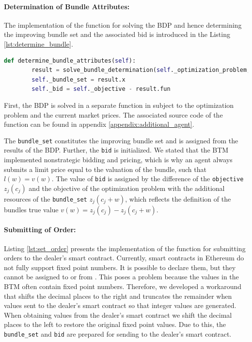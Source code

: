 \paragraph{Determination of Bundle Attributes:} The implementation of the function for solving the BDP and hence determining 
the improving bundle set and the associated bid is introduced in the Listing \ref{lst:determine_bundle}.

\begin{lstlisting}[label=lst:determine_bundle, caption=Determination of Bundle Attribute, language=Python]
    def determine_bundle_attributes(self):
        result = solve_bundle_determination(self._optimization_problem, self._mkt_prices)
        self._bundle_set = result.x
        self._bid = self._objective - result.fun
\end{lstlisting}

First, the BDP is solved in a separate function in subject to the optimization problem and the current market prices.
The associated source code of the function can be found in appendix \ref{appendix:additional_agent}.

The \verb|bundle_set| constitutes the improving bundle set and is assigned from the results of the BDP.
Further, the \verb|bid| is initialized. We stated that the BTM implemented nonstrategic bidding and pricing,
which is why an agent always submits a limit price equal to the valuation of the bundle, such that $l(w) = v(w)$.
The value of \verb|bid| is assigned by the difference of the \verb|objective| $z_{j}(c_{j})$ and the 
objective of the optimization problem with the additional resources of the \verb|bundle_set| $z_{j}(c_{j}+w)$, 
which reflects the definition of the bundles true value $v(w) = z_{j}(c_{j}) - z_{j}(c_{j}+w)$.

\paragraph{Submitting of Order:} Listing \ref{lst:set_order} presents the implementation of the function for 
submitting orders to the dealer's smart contract.
Currently, smart contracts in Ethereum do not fully 
support fixed point numbers. It is possible to declare them, but they cannot be assigned to or from .
This poses a problem because the values in the BTM often contain fixed point numbers. Therefore, 
we developed a workaround that shifts the decimal places to the right and truncates
the remainder when values sent to the dealer's smart contract so that integer values are generated.
When obtaining values from the dealer's smart contract we shift the decimal places to the left to restore 
the original fixed point values. 
Due to this, the \verb|bundle_set| and \verb|bid| are prepared for 
sending to the dealer's smart contract.

